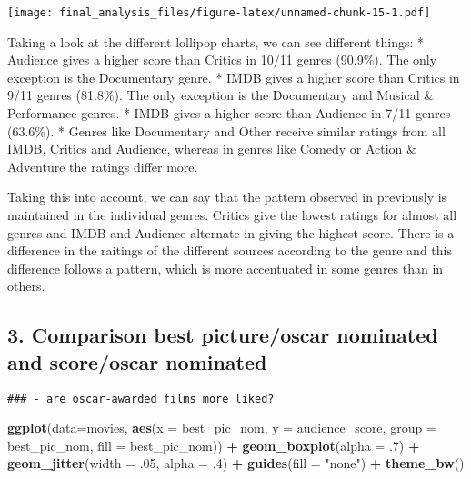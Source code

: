 \documentclass[]{article}
\newenvironment{Shaded}{\begin{snugshade}}{\end{snugshade}}
\newcommand{\KeywordTok}[1]{\textcolor[rgb]{0.13,0.29,0.53}{\textbf{#1}}}
\newcommand{\DataTypeTok}[1]{\textcolor[rgb]{0.13,0.29,0.53}{#1}}
\newcommand{\DecValTok}[1]{\textcolor[rgb]{0.00,0.00,0.81}{#1}}
\newcommand{\StringTok}[1]{\textcolor[rgb]{0.31,0.60,0.02}{#1}}
\newcommand{\OperatorTok}[1]{\textcolor[rgb]{0.81,0.36,0.00}{\textbf{#1}}}
\newcommand{\NormalTok}[1]{#1}
\begin{document}
\texttt{[image: final\_analysis\_files/figure-latex/unnamed-chunk-15-1.pdf]}

Taking a look at the different lollipop charts, we can see different
things: * Audience gives a higher score than Critics in 10/11 genres
(90.9\%). The only exception is the Documentary genre. * IMDB gives a
higher score than Critics in 9/11 genres (81.8\%). The only exception is
the Documentary and Musical \& Performance genres. * IMDB gives a higher
score than Audience in 7/11 genres (63.6\%). * Genres like Documentary
and Other receive similar ratings from all IMDB, Critics and Audience,
whereas in genres like Comedy or Action \& Adventure the ratings differ
more.

Taking this into account, we can say that the pattern observed in
previously is maintained in the individual genres. Critics give the
lowest ratings for almost all genres and IMDB and Audience alternate in
giving the highest score. There is a difference in the raitings of the
different sources according to the genre and this difference follows a
pattern, which is more accentuated in some genres than in others.

\subsection{3. Comparison best picture/oscar nominated and score/oscar
nominated}\label{comparison-best-pictureoscar-nominated-and-scoreoscar-nominated}

\begin{verbatim}
### - are oscar-awarded films more liked?
\end{verbatim}

\begin{Shaded}
\begin{Highlighting}[]
\KeywordTok{ggplot}\NormalTok{(}\DataTypeTok{data=}\NormalTok{movies, }\KeywordTok{aes}\NormalTok{(}\DataTypeTok{x =}\NormalTok{ best_pic_nom, }\DataTypeTok{y =}\NormalTok{ audience_score, }\DataTypeTok{group =}\NormalTok{ best_pic_nom, }\DataTypeTok{fill =}\NormalTok{ best_pic_nom)) }\OperatorTok{+}\StringTok{ }\KeywordTok{geom_boxplot}\NormalTok{(}\DataTypeTok{alpha =}\NormalTok{ .}\DecValTok{7}\NormalTok{) }\OperatorTok{+}\StringTok{ }\KeywordTok{geom_jitter}\NormalTok{(}\DataTypeTok{width =}\NormalTok{ .}\DecValTok{05}\NormalTok{, }\DataTypeTok{alpha =}\NormalTok{ .}\DecValTok{4}\NormalTok{) }\OperatorTok{+}\StringTok{ }\KeywordTok{guides}\NormalTok{(}\DataTypeTok{fill =} \StringTok{"none"}\NormalTok{) }\OperatorTok{+}\StringTok{ }\KeywordTok{theme_bw}\NormalTok{()}
\end{Highlighting}
\end{Shaded}
\end{document}
